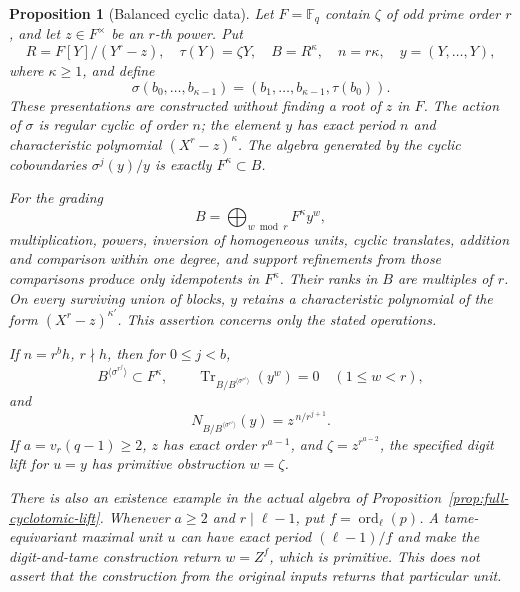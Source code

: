 \documentclass[11pt]{article}
\newtheorem{proposition}[theorem]{Proposition}
\theoremstyle{definition}
\theoremstyle{remark}
\begin{document}
\begin{proposition}[Balanced cyclic data]
\label{prop:balanced-cyclic-example}
Let \(F=\mathbb F_q\) contain \(\zeta\) of odd prime order \(r\),
and let \(z\in F^\times\) be an \(r\)-th power.
Put
\[
 R=F[Y]/(Y^r-z),\quad \tau(Y)=\zeta Y,\quad
 B=R^\kappa,\quad n=r\kappa,\quad y=(Y,\ldots,Y),
\]
where \(\kappa\geq1\), and define
\[
 \sigma(b_0,\ldots,b_{\kappa-1})
       =(b_1,\ldots,b_{\kappa-1},\tau(b_0)).
\]
These presentations are constructed without finding a root of \(z\)
in \(F\).  The action of \(\sigma\) is regular cyclic of order \(n\);
the element \(y\) has exact period \(n\) and characteristic polynomial
\((X^r-z)^\kappa\).
The algebra generated by the cyclic coboundaries
\(\sigma^j(y)/y\) is exactly \(F^\kappa\subset B\).

For the grading
\[
                       B=\bigoplus_{w\bmod r}F^\kappa y^w,
\]
multiplication, powers, inversion of homogeneous units,
cyclic translates, addition and comparison within one degree,
and support refinements from those comparisons produce only
idempotents in \(F^\kappa\).  Their ranks in \(B\) are multiples
of \(r\).  On every surviving union of blocks, \(y\) retains
a characteristic polynomial of the form \((X^r-z)^{\kappa'}\).
This assertion concerns only the stated operations.

If \(n=r^b h\), \(r\nmid h\), then for \(0\leq j<b\),
\[
 B^{\langle\sigma^{r^j}\rangle}\subset F^\kappa,\qquad
 \operatorname{Tr}_{B/B^{\langle\sigma^{r^j}\rangle}}(y^w)=0
          \quad(1\leq w<r),
\]
and
\[
          N_{B/B^{\langle\sigma^{r^j}\rangle}}(y)
                            =z^{\,n/r^{j+1}}.
\]
If \(a=v_r(q-1)\geq2\), \(z\) has exact order \(r^{a-1}\),
and \(\zeta=z^{r^{a-2}}\), the specified digit lift for \(u=y\)
has primitive obstruction \(w=\zeta\).

There is also an existence example in the actual algebra of
Proposition~\ref{prop:full-cyclotomic-lift}.
Whenever \(a\geq2\) and \(r\mid\ell-1\), put
\(f=\operatorname{ord}_\ell(p)\).
A tame-equivariant maximal unit \(u\) can have exact period
\((\ell-1)/f\) and make the digit-and-tame construction return
\(w=Z^f\), which is primitive.
This does not assert that the construction from the original
inputs returns that particular unit.
\end{proposition}
\end{document}
